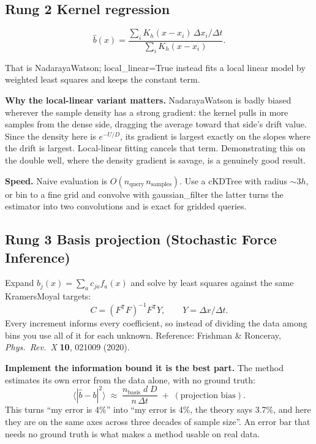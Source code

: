 \documentclass[11pt,a4paper]{article}
\newcommand{\code}[1]{{\ttfamily\small #1}}
\begin{document}
\subsection{Rung 2 \textemdash{} Kernel regression}

\[
  \hat b(x) = \frac{\sum_i K_h(x-x_i)\,\Delta x_i/\Delta t}{\sum_i K_h(x-x_i)} .
\]

That is Nadaraya\textendash{}Watson; \code{local\_linear=True} instead fits a local
linear model by weighted least squares and keeps the constant term.

\textbf{Why the local-linear variant matters.} Nadaraya\textendash{}Watson is badly
biased wherever the sample density has a strong gradient: the kernel pulls in more
samples from the dense side, dragging the average toward that side's drift value. Since
the density here is $e^{-U/D}$, its gradient is largest exactly on the slopes where the
drift is largest. Local-linear fitting cancels that term. Demonstrating this on the
double well, where the density gradient is savage, is a genuinely good result.

\textbf{Speed.} Naive evaluation is $O(n_{\mathrm{query}}\,n_{\mathrm{samples}})$. Use a
\code{cKDTree} with radius $\sim3h$, or bin to a fine grid and convolve with
\code{gaussian\_filter} \textemdash{} the latter turns the estimator into two
convolutions and is exact for gridded queries.

\subsection{Rung 3 \textemdash{} Basis projection (Stochastic Force Inference)}

Expand $b_j(x) = \sum_a c_{ja} f_a(x)$ and solve by least squares against the same
Kramers\textendash{}Moyal targets:
\[
  C = (F^{\mathsf T}F)^{-1} F^{\mathsf T} Y , \qquad Y = \Delta x/\Delta t .
\]
Every increment informs every coefficient, so instead of dividing the data among bins
you use all of it for each unknown. Reference: Frishman \& Ronceray, \emph{Phys.\ Rev.\
X} \textbf{10}, 021009 (2020).

\begin{keybox}
\textbf{Implement the information bound \textemdash{} it is the best part.} The method
estimates its own error from the data alone, with no ground truth:
\[
  \big\langle |\hat b - b|^2 \big\rangle \;\approx\;
  \frac{n_{\mathrm{basis}}\; d\; D}{n\,\Delta t} \;+\; (\text{projection bias}) .
\]
This turns ``my error is 4\%'' into ``my error is 4\%, the theory says 3.7\%, and here
they are on the same axes across three decades of sample size''. An error bar that needs
no ground truth is what makes a method usable on real data.
\end{keybox}
\end{document}
